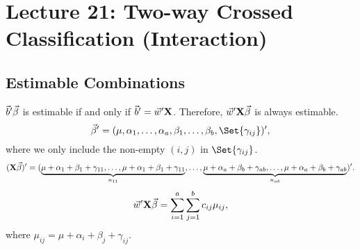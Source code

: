 \section{Lecture 21: Two-way Crossed Classification (Interaction)}
\subsection*{Estimable Combinations}
$ \vec{b}'\vec{\beta} $ is estimable if and only if
$ \vec{b}'=\vec{w}'\mathbf{X} $. Therefore,
$ \vec{w}'\mathbf{X}\vec{\beta} $ is always estimable.
\[ \Vector{\beta}'=(\mu,\alpha_1,\ldots,\alpha_a,\beta_1,\ldots,\beta_b,\Set{\gamma_{ij}})', \]
where we only include the non-empty $ (i,j) $ in $ \Set{\gamma_{ij}} $.
\[ (\mathbf{X}\vec{\beta})'=(\underbrace{\mu+\alpha_1+\beta_1+\gamma_{11},\ldots,\mu+\alpha_1+\beta_1+\gamma_{11}}_{n_{11}},
    \ldots,\underbrace{\mu+\alpha_a+\beta_b+\gamma_{ab},\ldots,\mu+\alpha_a+\beta_b+\gamma_{ab}}_{n_{ab}})'. \]
\[ \vec{w}'\mathbf{X}\vec{\beta}=\sum_{i=1}^{a}\sum_{j=1}^{b}c_{ij}\mu_{ij}, \]
where $ \mu_{ij}=\mu+\alpha_i+\beta_j+\gamma_{ij} $.
